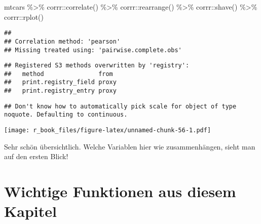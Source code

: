 \documentclass[
]{book}
\newenvironment{Shaded}{\begin{snugshade}}{\end{snugshade}}
\newcommand{\FunctionTok}[1]{\textcolor[rgb]{0.00,0.00,0.00}{#1}}
\newcommand{\NormalTok}[1]{#1}
\newcommand{\SpecialCharTok}[1]{\textcolor[rgb]{0.00,0.00,0.00}{#1}}
\begin{document}
\begin{Shaded}
\begin{Highlighting}[]
\NormalTok{mtcars }\SpecialCharTok{\%\textgreater{}\%} 
\NormalTok{  corrr}\SpecialCharTok{::}\FunctionTok{correlate}\NormalTok{() }\SpecialCharTok{\%\textgreater{}\%}
\NormalTok{  corrr}\SpecialCharTok{::}\FunctionTok{rearrange}\NormalTok{() }\SpecialCharTok{\%\textgreater{}\%}
\NormalTok{  corrr}\SpecialCharTok{::}\FunctionTok{shave}\NormalTok{() }\SpecialCharTok{\%\textgreater{}\%} 
\NormalTok{  corrr}\SpecialCharTok{::}\FunctionTok{rplot}\NormalTok{()}
\end{Highlighting}
\end{Shaded}

\begin{verbatim}
## 
## Correlation method: 'pearson'
## Missing treated using: 'pairwise.complete.obs'
\end{verbatim}

\begin{verbatim}
## Registered S3 methods overwritten by 'registry':
##   method               from 
##   print.registry_field proxy
##   print.registry_entry proxy
\end{verbatim}

\begin{verbatim}
## Don't know how to automatically pick scale for object of type noquote. Defaulting to continuous.
\end{verbatim}

\texttt{[image: r\_book\_files/figure-latex/unnamed-chunk-56-1.pdf]}

Sehr schön übersichtlich. Welche Variablen hier wie zusammenhängen, sieht man auf den ersten Blick!

\hypertarget{wichtige-funktionen-aus-diesem-kapitel-3}{%
\section*{Wichtige Funktionen aus diesem Kapitel}\label{wichtige-funktionen-aus-diesem-kapitel-3}}
\end{document}
